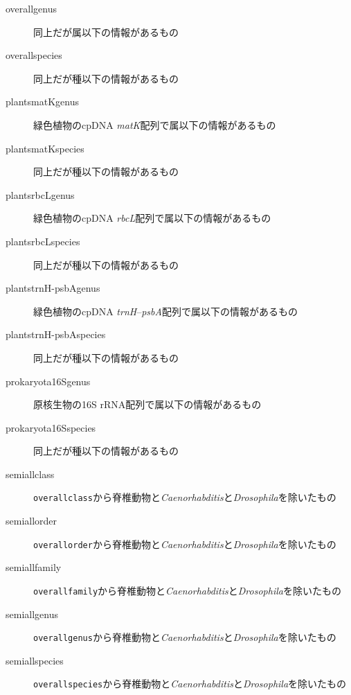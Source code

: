 \documentclass[titlepage,10pt,a4paper,english]{jsbook}
\begin{document}
\begin{description}
\item[overall{\textunderscore}genus] 同上だが属以下の情報があるもの
\item[overall{\textunderscore}species] 同上だが種以下の情報があるもの
\item[plants{\textunderscore}matK{\textunderscore}genus] 緑色植物のcpDNA \textit{matK}配列で属以下の情報があるもの
\item[plants{\textunderscore}matK{\textunderscore}species] 同上だが種以下の情報があるもの
\item[plants{\textunderscore}rbcL{\textunderscore}genus] 緑色植物のcpDNA \textit{rbcL}配列で属以下の情報があるもの
\item[plants{\textunderscore}rbcL{\textunderscore}species] 同上だが種以下の情報があるもの
\item[plants{\textunderscore}trnH-psbA{\textunderscore}genus] 緑色植物のcpDNA \textit{trnH}--\textit{psbA}配列で属以下の情報があるもの
\item[plants{\textunderscore}trnH-psbA{\textunderscore}species] 同上だが種以下の情報があるもの
\item[prokaryota{\textunderscore}16S{\textunderscore}genus] 原核生物の16S rRNA配列で属以下の情報があるもの
\item[prokaryota{\textunderscore}16S{\textunderscore}species] 同上だが種以下の情報があるもの
\item[semiall{\textunderscore}class] \texttt{overall{\textunderscore}class}から脊椎動物と\textit{Caenorhabditis}と\textit{Drosophila}を除いたもの
\item[semiall{\textunderscore}order] \texttt{overall{\textunderscore}order}から脊椎動物と\textit{Caenorhabditis}と\textit{Drosophila}を除いたもの
\item[semiall{\textunderscore}family] \texttt{overall{\textunderscore}family}から脊椎動物と\textit{Caenorhabditis}と\textit{Drosophila}を除いたもの
\item[semiall{\textunderscore}genus] \texttt{overall{\textunderscore}genus}から脊椎動物と\textit{Caenorhabditis}と\textit{Drosophila}を除いたもの
\item[semiall{\textunderscore}species] \texttt{overall{\textunderscore}species}から脊椎動物と\textit{Caenorhabditis}と\textit{Drosophila}を除いたもの
\end{description}
\end{document}
